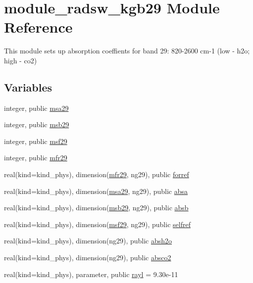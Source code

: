 \hypertarget{namespacemodule__radsw__kgb29}{}\section{module\+\_\+radsw\+\_\+kgb29 Module Reference}
\label{namespacemodule__radsw__kgb29}


This module sets up absorption coeffients for band 29\+: 820-\/2600 cm-\/1 (low -\/ h2o; high -\/ co2)  


\subsection*{Variables}
\begin{DoxyCompactItemize}
\item 
integer, public \hyperlink{namespacemodule__radsw__kgb29_adbee6e5d3b3efc437ff8815e42962b92}{msa29}
\item 
integer, public \hyperlink{namespacemodule__radsw__kgb29_add8e18a273d5fa133f22fb47c4d722da}{msb29}
\item 
integer, public \hyperlink{namespacemodule__radsw__kgb29_ace849342fcb0d18d825318a2ee26ce0e}{msf29}
\item 
integer, public \hyperlink{namespacemodule__radsw__kgb29_a866ce18e53b84d75d51dd8c6a999ee7b}{mfr29}
\item 
real(kind=kind\+\_\+phys), dimension(\hyperlink{namespacemodule__radsw__kgb29_a866ce18e53b84d75d51dd8c6a999ee7b}{mfr29}, ng29), public \hyperlink{namespacemodule__radsw__kgb29_a6e4d495b4588d3c794047e71497661a0}{forref}
\item 
real(kind=kind\+\_\+phys), dimension(\hyperlink{namespacemodule__radsw__kgb29_adbee6e5d3b3efc437ff8815e42962b92}{msa29}, ng29), public \hyperlink{namespacemodule__radsw__kgb29_a1132fd19edc0312f6bcc905619f3bdfd}{absa}
\item 
real(kind=kind\+\_\+phys), dimension(\hyperlink{namespacemodule__radsw__kgb29_add8e18a273d5fa133f22fb47c4d722da}{msb29}, ng29), public \hyperlink{namespacemodule__radsw__kgb29_ac9fb794bc4e4a02964b5e5d1431c31c3}{absb}
\item 
real(kind=kind\+\_\+phys), dimension(\hyperlink{namespacemodule__radsw__kgb29_ace849342fcb0d18d825318a2ee26ce0e}{msf29}, ng29), public \hyperlink{namespacemodule__radsw__kgb29_a468e2dd6001734d10784c8fb7b5df4e3}{selfref}
\item 
real(kind=kind\+\_\+phys), dimension(ng29), public \hyperlink{namespacemodule__radsw__kgb29_acab70725ca7faf002f04306fe1798e02}{absh2o}
\item 
real(kind=kind\+\_\+phys), dimension(ng29), public \hyperlink{namespacemodule__radsw__kgb29_aa9a57e32dfbb8979478aa8c931ff0e2d}{absco2}
\item 
real(kind=kind\+\_\+phys), parameter, public \hyperlink{namespacemodule__radsw__kgb29_abc0a41a10d73674e124115fe0511cc23}{rayl} = 9.\+30e-\/11
\end{DoxyCompactItemize}


